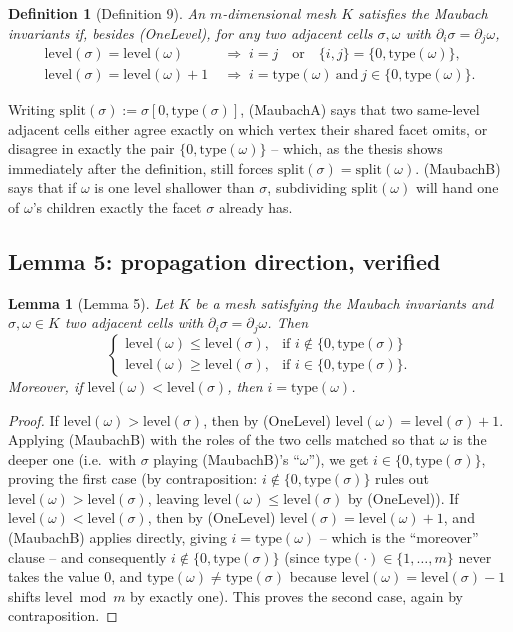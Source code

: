 \documentclass[11pt]{article}
\newtheorem*{defthm}{Definition}
\newtheorem*{lemthm}{Lemma}
\newcommand{\type}{\mathrm{type}}
\newcommand{\level}{\mathrm{level}}
\newcommand{\msplit}{\mathrm{split}}
\begin{document}
\begin{defthm}[Definition 9]
An $m$-dimensional mesh $K$ satisfies the \emph{Maubach invariants} if,
besides (OneLevel), for any two adjacent cells $\sigma,\omega$ with
$\partial_i\sigma=\partial_j\omega$,
\begin{align}
  \level(\sigma)=\level(\omega) \;&\Longrightarrow\;
    i=j \quad\text{or}\quad \{i,j\}=\{0,\type(\omega)\}, \tag{MaubachA}\\
  \level(\sigma)=\level(\omega)+1 \;&\Longrightarrow\;
    i=\type(\omega) \ \text{and}\ j\in\{0,\type(\omega)\}. \tag{MaubachB}
\end{align}
\end{defthm}

Writing $\msplit(\sigma):=\sigma[0,\type(\sigma)]$, (MaubachA) says that two
same-level adjacent cells either agree exactly on which vertex their
shared facet omits, or disagree in exactly the pair $\{0,\type(\omega)\}$ --
which, as the thesis shows immediately after the definition, still forces
$\msplit(\sigma)=\msplit(\omega)$. (MaubachB) says that if $\omega$ is one
level shallower than $\sigma$, subdividing $\msplit(\omega)$ will hand one
of $\omega$'s children exactly the facet $\sigma$ already has.

\subsection{Lemma 5: propagation direction, verified}
\label{sec:lemma5}

\begin{lemthm}[Lemma 5]
Let $K$ be a mesh satisfying the Maubach invariants and $\sigma,\omega\in K$
two adjacent cells with $\partial_i\sigma=\partial_j\omega$. Then
\[
\begin{cases}
\level(\omega)\le\level(\sigma), & \text{if } i\notin\{0,\type(\sigma)\}\\
\level(\omega)\ge\level(\sigma), & \text{if } i\in\{0,\type(\sigma)\}.
\end{cases}
\]
Moreover, if $\level(\omega)<\level(\sigma)$, then $i=\type(\omega)$.
\end{lemthm}

\begin{proof}
If $\level(\omega)>\level(\sigma)$, then by (OneLevel)
$\level(\omega)=\level(\sigma)+1$. Applying (MaubachB) with the roles of
the two cells matched so that $\omega$ is the deeper one (i.e.\ with
$\sigma$ playing (MaubachB)'s ``$\omega$''), we get $i\in\{0,\type(\sigma)\}$,
proving the first case (by contraposition: $i\notin\{0,\type(\sigma)\}$
rules out $\level(\omega)>\level(\sigma)$, leaving $\level(\omega)\le\level(\sigma)$
by (OneLevel)). If $\level(\omega)<\level(\sigma)$, then by (OneLevel)
$\level(\sigma)=\level(\omega)+1$, and (MaubachB) applies directly, giving
$i=\type(\omega)$ -- which is the ``moreover'' clause -- and consequently
$i\notin\{0,\type(\sigma)\}$ (since $\type(\cdot)\in\{1,\dots,m\}$ never
takes the value $0$, and $\type(\omega)\ne\type(\sigma)$ because
$\level(\omega)=\level(\sigma)-1$ shifts $\level\bmod m$ by exactly one).
This proves the second case, again by contraposition.
\end{proof}
\end{document}
